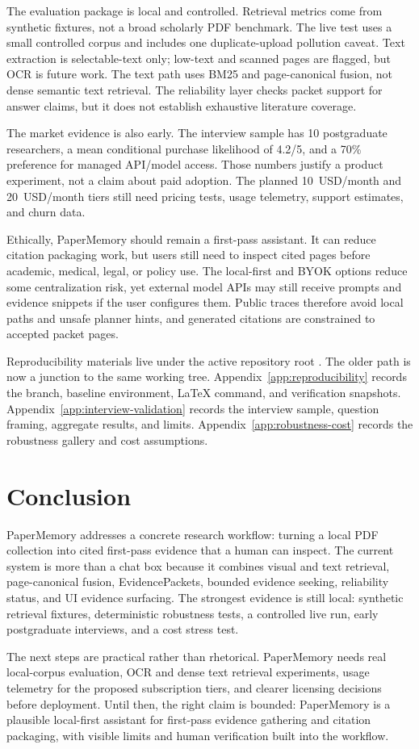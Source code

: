 The evaluation package is local and controlled. Retrieval metrics come from synthetic fixtures, not a broad scholarly PDF benchmark. The live test uses a small controlled corpus and includes one duplicate-upload pollution caveat. Text extraction is selectable-text only; low-text and scanned pages are flagged, but OCR is future work. The text path uses BM25 and page-canonical fusion, not dense semantic text retrieval. The reliability layer checks packet support for answer claims, but it does not establish exhaustive literature coverage.

The market evidence is also early. The interview sample has 10 postgraduate researchers, a mean conditional purchase likelihood of 4.2/5, and a 70\% preference for managed API/model access. Those numbers justify a product experiment, not a claim about paid adoption. The planned 10~USD/month and 20~USD/month tiers still need pricing tests, usage telemetry, support estimates, and churn data.

Ethically, PaperMemory should remain a first-pass assistant. It can reduce citation packaging work, but users still need to inspect cited pages before academic, medical, legal, or policy use. The local-first and BYOK options reduce some centralization risk, yet external model APIs may still receive prompts and evidence snippets if the user configures them. Public traces therefore avoid local paths and unsafe planner hints, and generated citations are constrained to accepted packet pages.

Reproducibility materials live under the active repository root . The older  path is now a junction to the same working tree. Appendix~\ref{app:reproducibility} records the branch, baseline environment, LaTeX command, and verification snapshots. Appendix~\ref{app:interview-validation} records the interview sample, question framing, aggregate results, and limits. Appendix~\ref{app:robustness-cost} records the robustness gallery and cost assumptions.

\section{Conclusion}
\label{sec:conclusion}

PaperMemory addresses a concrete research workflow: turning a local PDF collection into cited first-pass evidence that a human can inspect. The current system is more than a chat box because it combines visual and text retrieval, page-canonical fusion, EvidencePackets, bounded evidence seeking, reliability status, and UI evidence surfacing. The strongest evidence is still local: synthetic retrieval fixtures, deterministic robustness tests, a controlled live run, early postgraduate interviews, and a cost stress test.

The next steps are practical rather than rhetorical. PaperMemory needs real local-corpus evaluation, OCR and dense text retrieval experiments, usage telemetry for the proposed subscription tiers, and clearer licensing decisions before deployment. Until then, the right claim is bounded: PaperMemory is a plausible local-first assistant for first-pass evidence gathering and citation packaging, with visible limits and human verification built into the workflow.
